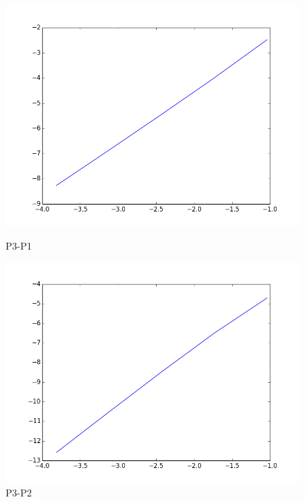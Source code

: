 \documentclass[a4paper,norsk]{article}
\begin{document}
\begin{figure}[h] 
  \label{ fig7} 
  \begin{minipage}[b]{0.5\linewidth}
    \centering
    \includegraphics[scale=0.3]{log_plot_p3_p1.png}   
    \caption{P3-P1} 
    \vspace{4ex}
  \end{minipage}%
  \begin{minipage}[b]{0.5\linewidth}
    \centering
   \includegraphics[scale=0.3]{log_plot_p3_p2.png}    
    \caption{P3-P2} 
    \vspace{4ex}
  \end{minipage} 
  \begin{minipage}[b]{0.5\linewidth}
    \centering

\end{minipage}
\end{figure}
\end{document}
